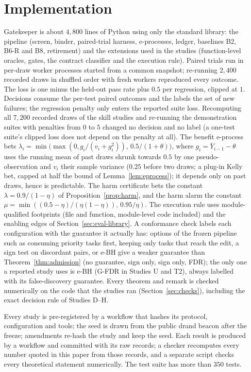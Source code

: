\section{Implementation}
\label{sec:impl}
Gatekeeper is about $4{,}800$ lines of Python using only the standard library: the pipeline (screen, binder, paired-trial harness,
e-processes, ledger, baselines B2, B6-R and B8, retirement) and the extensions used in the studies (function-level oracles, gates,
the contract classifier and the execution rule).  Paired trials run in per-draw worker processes started from a common snapshot;
re-running $2{,}400$ recorded draws in shuffled order with fresh workers reproduced every outcome.  The loss is one minus the
held-out pass rate plus $0.5$ per regression, clipped at $1$.  Decisions consume the per-test paired outcomes and the labels the set
of new failures; the regression penalty only enters the reported suite loss.  Recomputing all $7{,}200$ recorded draws of the skill
studies and re-running the demonstration suites with penalties from $0$ to $5$ changed no decision and no label
(a one-test suite's clipped loss does not depend on the penalty at all).
The benefit e-process bets $\lambda_i=\min\bigl(\max(0,g_i/(v_i+g_i^2)),\,0.5/(1+\theta)\bigr)$, where $g_i=\bar Y_{i-1}-\theta$ uses
the running mean of past draws shrunk towards $0.5$ by one pseudo-observation and $v_i$ their sample variance ($0.25$ before two draws; a plug-in Kelly
bet, capped at half the bound of Lemma~\ref{lem:eprocess}); it depends only on past draws, hence is predictable.  The harm
certificate bets the constant $\lambda=0.9/(1-\eta)$ of Proposition~\ref{prop:harm}, and the harm alarm the constant $\mu=\min((0.5-\eta)/(\eta(1-\eta)),\,0.95/\eta)$.
The execution rule uses module-qualified footprints (file and function, module-level code included) and the enabling edges of
Section~\ref{sec:eval-library}.  A conformance check labels each configuration with the guarantee it actually has: options of the
frozen pipeline such as consuming priority tasks first, keeping only tasks that reach the edit, a sign test on discordant pairs, or
e-BH give a weaker guarantee than Theorem~\ref{thm:admission} (no guarantee, sign only, sign only, FDR); the only one a reported study
uses is e-BH (G-FDR in Studies U and T2), always labelled with its false-discovery guarantee.  Every theorem and remark is checked numerically on the code that the studies ran (Section~\ref{sec:checks}),
including the exact decision rule of Studies D--H.

Every study is pre-registered by a workflow that hashes its protocol, configuration and tools; the seed is drawn from the public drand
beacon after the freeze; amendments re-hash the study and keep the seed.  Each result is produced by a workflow and committed with
its raw records; a checker recomputes every number quoted in this paper from those records, and a separate script checks every
theoretical statement numerically.  The test suite has more than $350$ tests.
